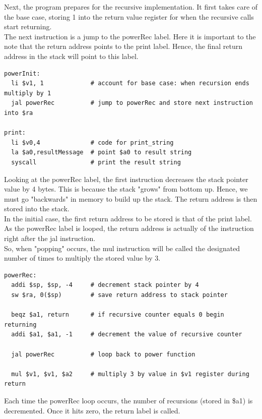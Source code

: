 \documentclass[twocolumn]{article}
\begin{document}
Next, the program prepares for the recursive implementation. It first takes care of the base case, storing 1 into the return value register for when the recursive calls start returning. \\

The next instruction is a jump to the powerRec label. Here it is important to the note that the return address points to the print label. Hence, the final return address in the stack will point to this label. 

\begin{verbatim}
powerInit:
  li $v1, 1             # account for base case: when recursion ends multiply by 1
  jal powerRec          # jump to powerRec and store next instruction into $ra
  
print:
  li $v0,4              # code for print_string
  la $a0,resultMessage  # point $a0 to result string
  syscall               # print the result string 
\end{verbatim}

Looking at the powerRec label, the first instruction decreases the stack pointer value by 4 bytes. This is because the stack "grows" from bottom up. Hence, we must go "backwards" in memory to build up the stack. The return address is then stored into the stack. \\

In the initial case, the first return address to be stored is that of the print label. As the powerRec label is looped, the return address is actually of the instruction right after the jal instruction. \\

So, when "popping" occurs, the mul instruction will be called the designated number of times to multiply the stored value by 3. \\

\begin{verbatim}
powerRec: 
  addi $sp, $sp, -4     # decrement stack pointer by 4
  sw $ra, 0($sp)        # save return address to stack pointer

  beqz $a1, return      # if recursive counter equals 0 begin returning
  addi $a1, $a1, -1	    # decrement the value of recursive counter
  
  jal powerRec          # loop back to power function
  
  mul $v1, $v1, $a2     # multiply 3 by value in $v1 register during return
\end{verbatim}

Each time the powerRec loop occurs, the number of recursions (stored in \$a1) is decremented. Once it hits zero, the return label is called. \\
\end{document}
